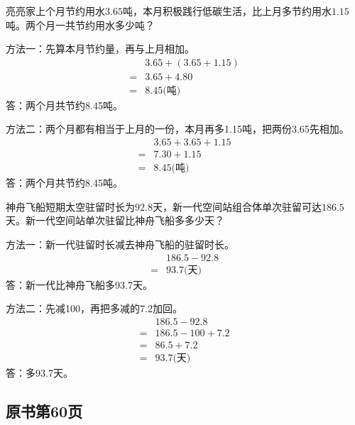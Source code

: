 亮亮家上个月节约用水\(3.65\)吨，本月积极践行低碳生活，比上月多节约用水\(1.15\)吨。两个月一共节约用水多少吨？\par
\begin{BookAnswer}
方法一：先算本月节约量，再与上月相加。\[\begin{aligned}&3.65+(3.65+1.15)\\={}&3.65+4.80\\={}&8.45\text{(吨)}\end{aligned}\]答：两个月共节约8.45吨。\par 方法二：两个月都有相当于上月的一份，本月再多1.15吨，把两份3.65先相加。\[\begin{aligned}&3.65+3.65+1.15\\={}&7.30+1.15\\={}&8.45\text{(吨)}\end{aligned}\]答：两个月共节约8.45吨。
\end{BookAnswer}

神舟飞船短期太空驻留时长为\(92.8\)天，新一代空间站组合体单次驻留可达\(186.5\)天。新一代空间站单次驻留比神舟飞船多多少天？\par
\begin{BookAnswer}
方法一：新一代驻留时长减去神舟飞船的驻留时长。\[\begin{aligned}&186.5-92.8\\={}&93.7\text{(天)}\end{aligned}\]答：新一代比神舟飞船多93.7天。\par 方法二：先减100，再把多减的7.2加回。\[\begin{aligned}&186.5-92.8\\={}&186.5-100+7.2\\={}&86.5+7.2\\={}&93.7\text{(天)}\end{aligned}\]答：多93.7天。
\end{BookAnswer}



\subsection*{原书第60页}

